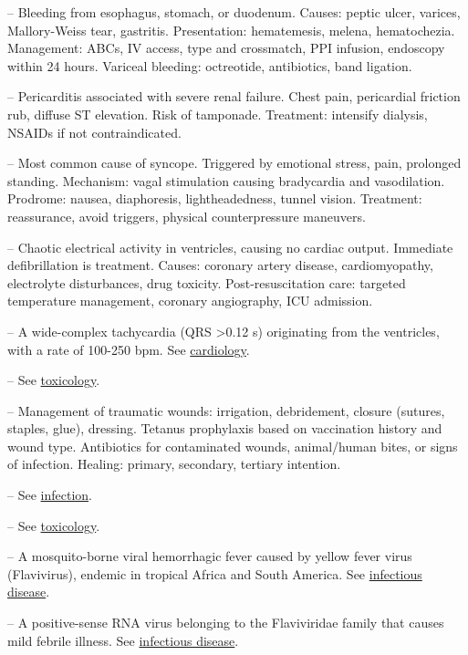 -- Bleeding from esophagus, stomach, or duodenum. Causes: peptic ulcer, varices, Mallory-Weiss tear, gastritis. Presentation: hematemesis, melena, hematochezia. Management: ABCs, IV access, type and crossmatch, PPI infusion, endoscopy within 24 hours. Variceal bleeding: octreotide, antibiotics, band ligation.

-- Pericarditis associated with severe renal failure. Chest pain, pericardial friction rub, diffuse ST elevation. Risk of tamponade. Treatment: intensify dialysis, NSAIDs if not contraindicated.

-- Most common cause of syncope. Triggered by emotional stress, pain, prolonged standing. Mechanism: vagal stimulation causing bradycardia and vasodilation. Prodrome: nausea, diaphoresis, lightheadedness, tunnel vision. Treatment: reassurance, avoid triggers, physical counterpressure maneuvers.

-- Chaotic electrical activity in ventricles, causing no cardiac output. Immediate defibrillation is treatment. Causes: coronary artery disease, cardiomyopathy, electrolyte disturbances, drug toxicity. Post-resuscitation care: targeted temperature management, coronary angiography, ICU admission.

-- A wide-complex tachycardia (QRS >0.12 s) originating from the ventricles, with a rate of 100-250 bpm. See \hyperlink{Cardiology}{cardiology}.

-- See \hyperlink{Toxicology}{toxicology}.

-- Management of traumatic wounds: irrigation, debridement, closure (sutures, staples, glue), dressing. Tetanus prophylaxis based on vaccination history and wound type. Antibiotics for contaminated wounds, animal/human bites, or signs of infection. Healing: primary, secondary, tertiary intention.

-- See \hyperlink{Infection}{infection}.

-- See \hyperlink{Toxicology}{toxicology}.

-- A mosquito-borne viral hemorrhagic fever caused by yellow fever virus (Flavivirus), endemic in tropical Africa and South America. See \hyperlink{Infectious Disease}{infectious disease}.

-- A positive-sense RNA virus belonging to the Flaviviridae family that causes mild febrile illness. See \hyperlink{Infectious Disease}{infectious disease}.
